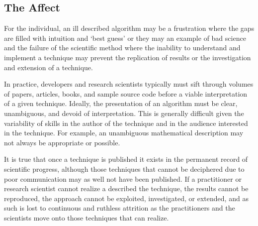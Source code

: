 \documentclass[a4paper, 11pt]{article}
\begin{document}
\subsection{The Affect}
For the individual, an ill described algorithm may be a frustration where the gaps are filled with intuition and `best guess' or they may an example of bad science and the failure of the scientific method where the inability to understand and implement a technique may prevent the replication of results or the investigation and extension of a technique. 

In practice, developers and research scientists typically must sift through volumes of papers, articles, books, and sample source code before a viable interpretation of a given technique. Ideally, the presentation of an algorithm must be clear, unambiguous, and devoid of interpretation. This is generally difficult given the variability of skills in the author of the technique and in the audience interested in the technique. For example, an unambiguous mathematical description may not always be appropriate or possible.

It is true that once a technique is published it exists in the permanent record of scientific progress, although those techniques that cannot be deciphered due to poor communication may as well not have been published. If a practitioner or research scientist cannot realize a described the technique, the results cannot be reproduced, the approach cannot be exploited, investigated, or extended, and as such is lost to continuous and ruthless attrition as the practitioners and the scientists move onto those techniques that can realize.
\end{document}
